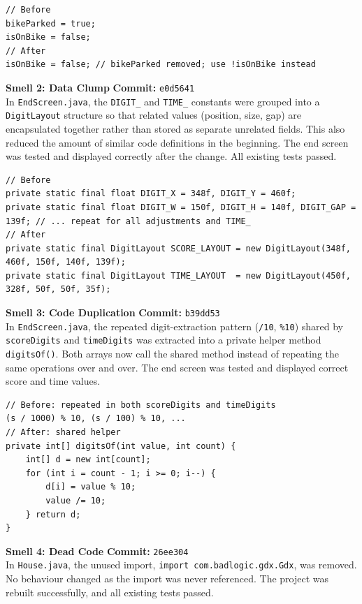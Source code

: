 \documentclass[10pt]{article}
\begin{document}
\begin{lstlisting}
// Before
bikeParked = true;
isOnBike = false;
// After
isOnBike = false; // bikeParked removed; use !isOnBike instead
\end{lstlisting}

\smallskip

\textbf{Smell 2: Data Clump} \quad \textbf{Commit:} \texttt{e0d5641} \\
In \texttt{EndScreen.java}, the \texttt{DIGIT\_} and \texttt{TIME\_} constants 
were grouped into a \texttt{DigitLayout} structure so that related values 
(position, size, gap) are encapsulated together rather than stored as separate 
unrelated fields. This also reduced the amount of similar code definitions in the beginning.  The end screen was tested and displayed correctly after the change. All existing tests passed.

\begin{lstlisting}
// Before
private static final float DIGIT_X = 348f, DIGIT_Y = 460f;
private static final float DIGIT_W = 150f, DIGIT_H = 140f, DIGIT_GAP = 139f; // ... repeat for all adjustments and TIME_ 
// After
private static final DigitLayout SCORE_LAYOUT = new DigitLayout(348f, 460f, 150f, 140f, 139f);
private static final DigitLayout TIME_LAYOUT  = new DigitLayout(450f, 328f, 50f, 50f, 35f);
\end{lstlisting}

\smallskip

\textbf{Smell 3: Code Duplication} \quad \textbf{Commit:} \texttt{b39dd53} \\
In \texttt{EndScreen.java}, the repeated digit-extraction pattern (\texttt{/10}, 
\texttt{\%10}) shared by \texttt{scoreDigits} and \texttt{timeDigits} was 
extracted into a private helper method \texttt{digitsOf()}. Both arrays now call the shared method 
instead of repeating the same operations over and over. The end screen was tested and displayed 
correct score and time values.

\begin{lstlisting}
// Before: repeated in both scoreDigits and timeDigits
(s / 1000) % 10, (s / 100) % 10, ...
// After: shared helper
private int[] digitsOf(int value, int count) {
    int[] d = new int[count];
    for (int i = count - 1; i >= 0; i--) {
        d[i] = value % 10;
        value /= 10;
    } return d;
}
\end{lstlisting}

\smallskip

\textbf{Smell 4: Dead Code} \quad \textbf{Commit:} \texttt{26ee304} \\
In \texttt{House.java}, the unused import, \texttt{import com.badlogic.gdx.Gdx}, was removed. No behaviour changed 
as the import was never referenced. The project was rebuilt successfully, and all existing tests passed.
\end{document}
